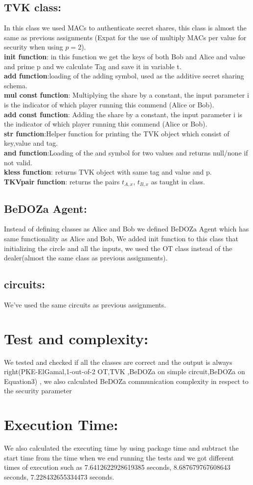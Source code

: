 \documentclass{article}
\begin{document}
\subsection*{TVK class:}
In this class we used MACs to authenticate secret shares, this class is almost the same as previous assignments (Expat for the use of multiply MACs per value for security when using $p=2$).
\\ \textbf{init function}: in this function we get the keys of both Bob and Alice and value and prime p and we calculate Tag and save it in variable t.
\\ \textbf{add function}:loading of the adding symbol, used as the additive secret sharing schema.
\\ \textbf{ mul const function}: Multiplying the share by a constant, the input parameter i is the indicator of which player running this commend (Alice or Bob).
\\ \textbf{add const function}: Adding the share by a constant, the input parameter i is the indicator of which player running this commend (Alice or Bob).
\\ \textbf{str function}:Helper function for printing the TVK object which consist of key,value and tag.
\\ \textbf{and function}:Loading of the and symbol for two values and returns null/none if not valid.
\\ \textbf{kless function}: returns TVK object with same tag and value and p.
 \\ \textbf{TKVpair function}: returns the pairs $t_{A,x}$, $t_{B,x}$  as taught in class.
\subsection*{BeDOZa Agent:}
Instead of defining classes as Alice and Bob we defined BeDOZa Agent which has same functionality as Alice and Bob, We added init function to this class that initializing the circle and all the inputs, we used the OT class instead of the dealer(almost the same class as previous assignments).
\subsection*{circuits:} We've used the same circuits as previous assignments.
\section*{Test and complexity:}
We tested and checked if all the classes are correct and the output is always right(PKE-ElGamal,1-out-of-2 OT,TVK ,BeDOZa on simple circuit,BeDOZa on Equation3) , we also calculated BeDOZa communication complexity in respect to the security parameter
\section*{Execution Time:}
We also calculated the executing time by using package time and subtract the start time from the time when we end running the tests and we got different times of execution such as  7.6412622928619385 seconds, 8.687679767608643 seconds, 7.228432655334473 seconds.
\end{document}
